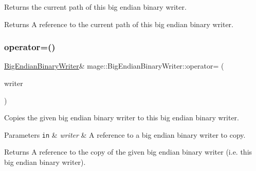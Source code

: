 Returns the current path of this big endian binary writer.

\begin{DoxyReturn}{Returns}
A reference to the current path of this big endian binary writer. 
\end{DoxyReturn}
\mbox{\label{classmage_1_1_big_endian_binary_writer_ae574f7d0b630890256996c52818ba633}} 
\subsubsection{\texorpdfstring{operator=()}{operator=()}\hspace{0.1cm}{\footnotesize\ttfamily [1/2]}}
{\footnotesize\ttfamily \mbox{\hyperlink{classmage_1_1_big_endian_binary_writer}{Big\+Endian\+Binary\+Writer}}\& mage\+::\+Big\+Endian\+Binary\+Writer\+::operator= (\begin{DoxyParamCaption}\item[{const \mbox{\hyperlink{classmage_1_1_big_endian_binary_writer}{Big\+Endian\+Binary\+Writer}} \&}]{writer }\end{DoxyParamCaption})\hspace{0.3cm}{\ttfamily [delete]}}

Copies the given big endian binary writer to this big endian binary writer.


\begin{DoxyParams}[1]{Parameters}
\mbox{\tt in}  & {\em writer} & A reference to a big endian binary writer to copy. \\
\hline
\end{DoxyParams}
\begin{DoxyReturn}{Returns}
A reference to the copy of the given big endian binary writer (i.\+e. this big endian binary writer). 
\end{DoxyReturn}
\mbox{\label{classmage_1_1_big_endian_binary_writer_a8c01bf43f5e941578c5c5947ea184a78}} 
